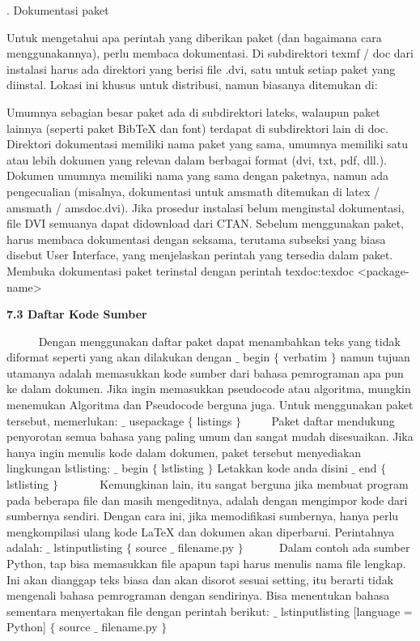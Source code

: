 . Dokumentasi paket \par
Untuk mengetahui apa perintah yang diberikan paket (dan bagaimana cara menggunakannya), perlu membaca dokumentasi. Di subdirektori texmf / doc dari instalasi harus ada direktori yang berisi file .dvi, satu untuk setiap paket yang diinstal. Lokasi ini khusus untuk distribusi, namun biasanya ditemukan di:\par





Umumnya sebagian besar paket ada di subdirektori lateks, walaupun paket lainnya (seperti paket BibTeX dan font) terdapat di subdirektori lain di doc. Direktori dokumentasi memiliki nama paket yang sama, umumnya memiliki satu atau lebih dokumen yang relevan dalam berbagai format (dvi, txt, pdf, dll.). Dokumen umumnya memiliki nama yang sama dengan paketnya, namun ada pengecualian (misalnya, dokumentasi untuk amsmath ditemukan di latex / amsmath / amsdoc.dvi). Jika prosedur instalasi belum menginstal dokumentasi, file DVI semuanya dapat didownload dari CTAN. Sebelum menggunakan paket, harus membaca dokumentasi dengan seksama, terutama subseksi yang biasa disebut User Interface, yang menjelaskan perintah yang tersedia dalam paket. Membuka dokumentasi paket terinstal dengan perintah texdoc:texdoc <package-name>\par
\vspace{12pt}
\noindent \textbf{7.3 Daftar Kode Sumber}\par
\noindent ~~~~~ Dengan menggunakan daftar paket dapat menambahkan teks yang tidak diformat seperti yang akan dilakukan dengan  $ \_ $  begin  $ \{ $ verbatim $ \} $  namun tujuan utamanya adalah memasukkan kode sumber dari bahasa pemrograman apa pun ke dalam dokumen. Jika ingin memasukkan pseudocode atau algoritma, mungkin menemukan Algoritma dan Pseudocode berguna juga. Untuk menggunakan paket tersebut, memerlukan: $ \_ $  usepackage  $ \{ $ listings $ \} $ ~~~~ Paket daftar mendukung penyorotan semua bahasa yang paling umum dan sangat mudah disesuaikan. Jika hanya ingin menulis kode dalam dokumen, paket tersebut menyediakan lingkungan lstlisting: $ \_ $  begin  $ \{ $ lstlisting $ \} $ Letakkan kode anda disini $ \_ $  end  $ \{ $ lstlisting $ \} $ ~~~~~~ Kemungkinan lain, itu sangat berguna jika membuat program pada beberapa file dan masih mengeditnya, adalah dengan mengimpor kode dari sumbernya sendiri. Dengan cara ini, jika memodifikasi sumbernya,  hanya perlu mengkompilasi ulang kode LaTeX dan dokumen akan diperbarui. Perintahnya adalah: $ \_ $  lstinputlisting  $ \{ $ source $ \_ $ filename.py $ \} $ ~~~~~ Dalam contoh ada sumber Python, tap bisa memasukkan file apapun tapi harus menulis nama file lengkap. Ini akan dianggap teks biasa dan akan disorot sesuai setting, itu berarti tidak mengenali bahasa pemrograman dengan sendirinya. Bisa menentukan bahasa sementara menyertakan file dengan perintah berikut: $ \_ $  lstinputlisting [language = Python]  $ \{ $ source $ \_ $ filename.py $ \} $ \par


